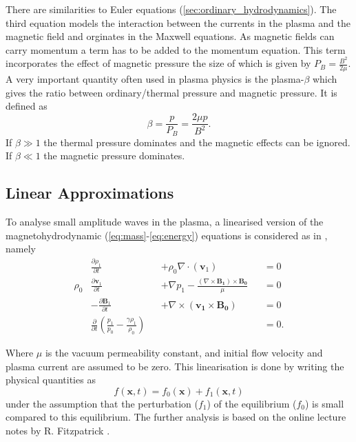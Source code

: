 \documentclass[a4paper]{article}
\numberwithin{figure}{section}
\numberwithin{equation}{section}
\begin{document}
There are similarities to Euler equations (\cref{sec:ordinary_hydrodynamics}).
The third equation models the interaction between the currents in the plasma and the magnetic field and orginates in the Maxwell equations.
As magnetic fields can carry momentum \cite[section 8.2]{GriffithsDavidJeffery2017Ite} a term has to be added to the momentum equation. 
This term incorporates the effect of magnetic pressure the size of which is given by $P_B = \frac{B^2}{2\mu}$. 
A very important quantity often used in plasma physics is the plasma-$\beta$ which gives the ratio between ordinary/thermal pressure and magnetic pressure. It is defined as \[
\beta = \frac{p}{P_B} = \frac{2 \mu p}{B^2}
.\] 
If $\beta \gg 1$ the thermal pressure dominates and the magnetic effects can be ignored. If $\beta \ll 1$ the magnetic pressure dominates.
\subsection{Linear Approximations} \label{sec:linear_approximations}

To analyse small amplitude waves in the plasma, a linearised version of the magnetohydrodynamic (\cref{eq:mass}-\eqref{eq:energy}) equations is considered as in \cite{Fitzpatricknotes}, namely
\begin{subequations}\label{eq:MHD_lin}
\begin{alignat}{3}
    &\frac{\partial \rho_1}{\partial t} &&+ \rho_0 \nabla  \cdot (\mathbf v_1) &&= 0 \label{eq:masslin}\\
    \rho_0&\frac{\partial \mathbf v_1}{\partial t} &&+  \nabla p_1 - \frac{(\nabla \times \mathbf{B_1}) \times \mathbf{B_0}}{\mu} &&= 0 \label{eq:cauchymomentlin}\\
    &-\frac{\partial \mathbf B_1}{\partial t} &&+ \nabla \times (\mathbf{v_1} \times \mathbf{B_0}) &&= 0 \label{eq:faradaylin}\\
    &\frac{\partial}{\partial t}\left(\frac{p_1}{p_0} - \frac{\gamma\rho_1}{\rho_0}\right) && &&= 0 \label{eq:energylin}.
\end{alignat}
\end{subequations}

Where $\mu$ is the vacuum permeability constant, and initial flow velocity and plasma current are assumed to be zero. This linearisation is done by writing the physical quantities as
\begin{equation*}
    f(\mathbf{x},t) = f_0(\mathbf{x}) + f_1(\mathbf{x},t)
\end{equation*}
under the assumption that the perturbation ($f_1$) of the equilibrium ($f_0$) is small compared to this equilibrium.
The further analysis is based on the online lecture notes by R. Fitzpatrick \cite{Fitzpatricknotes}.
\end{document}

